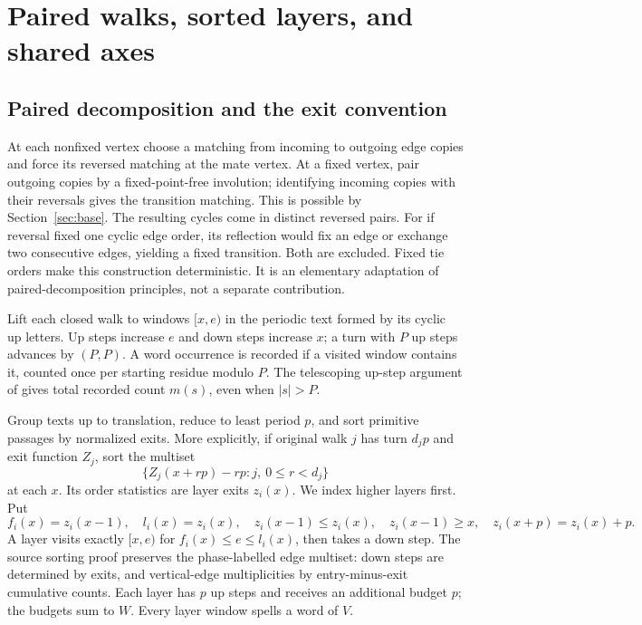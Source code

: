 \section{Paired walks, sorted layers, and shared axes}\label{sec:layers}
\subsection{Paired decomposition and the exit convention}\label{sec:paired-walks}
At each nonfixed vertex choose a matching from incoming to outgoing
edge copies and force its reversed matching at the mate vertex. At a
fixed vertex, pair outgoing copies by a fixed-point-free involution;
identifying incoming copies with their reversals gives the transition
matching. This is possible by Section~\ref{sec:base}. The resulting cycles
come in distinct reversed pairs. For if reversal fixed one cyclic
edge order, its reflection would fix an edge or exchange two consecutive
edges, yielding a fixed transition. Both are excluded. Fixed tie orders
make this construction deterministic. It is an elementary adaptation
of paired-decomposition principles, not a separate contribution.

Lift each closed walk to windows $[x,e)$ in the periodic text formed
by its cyclic up letters. Up steps increase $e$ and down steps increase
$x$; a turn with $P$ up steps advances by $(P,P)$. A word occurrence
is recorded if a visited window contains it, counted once per starting
residue modulo $P$. The telescoping up-step argument of
 gives total recorded count $m(s)$,
even when $|s|>P$.

Group texts up to translation, reduce to least period $p$, and sort
primitive passages by normalized exits. More explicitly, if original
walk $j$ has turn $d_jp$ and exit function $Z_j$, sort the multiset
\[
\{Z_j(x+rp)-rp: j,\ 0\le r<d_j\}
\]
at each $x$. Its order statistics are layer exits $z_i(x)$.
We index higher layers first. Put
\begin{equation}\label{eq:profiles}
f_i(x)=z_i(x-1),\quad l_i(x)=z_i(x),\quad
z_i(x-1)\le z_i(x),\quad z_i(x-1)\ge x,\quad
z_i(x+p)=z_i(x)+p.
\end{equation}
A layer visits exactly $[x,e)$ for $f_i(x)\le e\le l_i(x)$, then
takes a down step. The source sorting proof preserves the phase-labelled
edge multiset: down steps are determined by exits, and vertical-edge
multiplicities by entry-minus-exit cumulative counts. Each layer has
$p$ up steps and receives an additional budget $p$; the budgets sum
to $W$. Every layer window spells a word of $V$.

